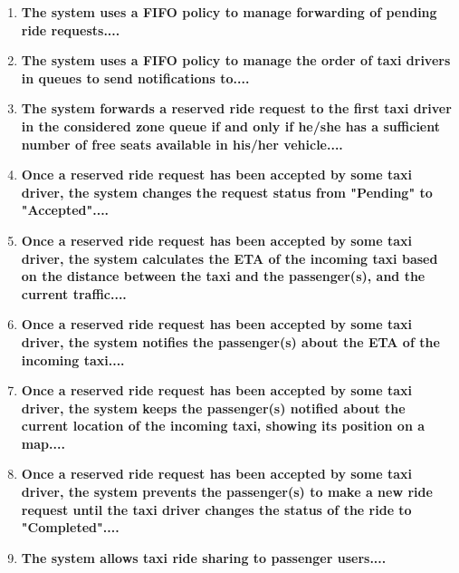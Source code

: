 \begin{enumerate}
	\item \textbf{The system uses a FIFO policy to manage forwarding of pending ride
		requests....}\\
	
	\item \textbf{The system uses a FIFO policy to manage the order of taxi drivers in
		queues to send notifications to....}\\
	
	\item \textbf{The system forwards a reserved ride request to the first taxi driver in the
		considered zone queue if and only if he/she has a sufficient number of free
		seats available in his/her vehicle....}\\
	
	\item \textbf{Once a reserved ride request has been accepted by some taxi driver, the
		system changes the request status from "Pending" to "Accepted"....}\\
	
	\item \textbf{Once a reserved ride request has been accepted by some taxi driver, the
		system calculates the ETA of the incoming taxi based on the distance
		between the taxi and the passenger(s), and the current traffic....}\\
	
	\item \textbf{Once a reserved ride request has been accepted by some taxi driver, the
		system notifies the passenger(s) about the ETA of the incoming taxi....}\\
	
	\item \textbf{Once a reserved ride request has been accepted by some taxi driver, the
		system keeps the passenger(s) notified about the current location of the
		incoming taxi, showing its position on a map....}\\
	
	\item \textbf{Once a reserved ride request has been accepted by some taxi driver, the
		system prevents the passenger(s) to make a new ride request until the taxi
		driver changes the status of the ride to "Completed"....}\\
	
	\item \textbf{The system allows taxi ride sharing to passenger users....}\\
	

\end{enumerate}
